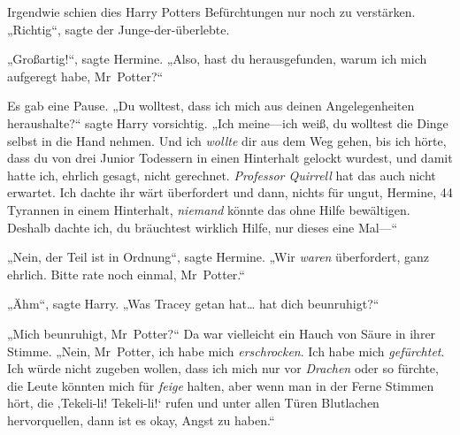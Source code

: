 Irgendwie schien dies Harry Potters Befürchtungen nur noch zu verstärken. „Richtig“, sagte der Junge-der-überlebte.

„Großartig!“, sagte Hermine. „Also, hast du herausgefunden, warum ich mich aufgeregt habe, Mr~Potter?“

Es gab eine Pause. „Du wolltest, dass ich mich aus deinen Angelegenheiten heraushalte?“ sagte Harry vorsichtig. „Ich meine—ich weiß, du wolltest die Dinge selbst in die Hand nehmen. Und ich \emph{wollte} dir aus dem Weg gehen, bis ich hörte, dass du von drei Junior Todessern in einen Hinterhalt gelockt wurdest, und damit hatte ich, ehrlich gesagt, nicht gerechnet. \emph{Professor Quirrell} hat das auch nicht erwartet. Ich dachte ihr wärt überfordert und dann, nichts für ungut, Hermine, 44 Tyrannen in einem Hinterhalt, \emph{niemand} könnte das ohne Hilfe bewältigen. Deshalb dachte ich, du bräuchtest wirklich Hilfe, nur dieses eine Mal—“

„Nein, der Teil ist in Ordnung“, sagte Hermine. „Wir \emph{waren} überfordert, ganz ehrlich. Bitte rate noch einmal, Mr~Potter.“

„Ähm“, sagte Harry. „Was Tracey getan hat… hat dich beunruhigt?“

„Mich beunruhigt, Mr~Potter?“ Da war vielleicht ein Hauch von Säure in ihrer Stimme. „Nein, Mr~Potter, ich habe mich \emph{erschrocken}. Ich habe mich \emph{gefürchtet}. Ich würde nicht zugeben wollen, dass ich mich nur vor \emph{Drachen} oder so fürchte, die Leute könnten mich für \emph{feige} halten, aber wenn man in der Ferne Stimmen hört, die ‚Tekeli-li! Tekeli-li!‘ rufen und unter allen Türen Blutlachen hervorquellen, dann ist es okay, Angst zu haben.“

